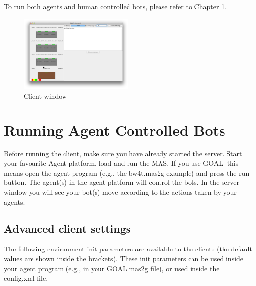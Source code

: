 \documentclass[11pt,a4paper]{article}
\begin{document}
To run both agents and human controlled bots, please refer to Chapter \ref{ch:runbots}.

\begin{figure}[!h]
\begin{center}
  \includegraphics[width=0.5\textwidth]{HumanPlayerGUI/hpg.png}
  \caption{Client window}\label{fig:Client}
\end{center}
\end{figure}


\section{Running Agent Controlled Bots}\label{ch:runbots}
Before running the client, make sure you have already started the server. Start your favourite Agent platform, load and run the MAS. If you use GOAL, this means open the agent program (e.g., the bw4t.mas2g example) and press the run button. The agent(s) in the agent platform will control the bots. In the server window you will see your bot(s) move according to the actions taken by your agents.

\subsection{Advanced client settings}\label{sec:clientsettings}
\label{sec:clientadvancedrunsettings}
The following environment init parameters are available to the clients (the default values are shown inside the brackets). These init parameters can be used inside your agent program (e.g., in your GOAL mas2g file), or used inside the config.xml file. 
\end{document}

